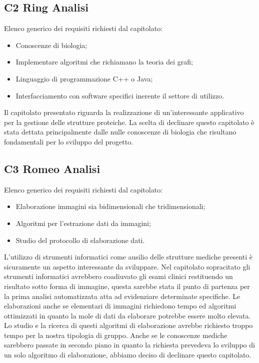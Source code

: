 \subsection{C2 Ring Analisi}
Elenco generico dei requisiti richiesti dal capitolato:
\begin{itemize} 
\item Conoscenze di biologia;
\item Implementare algoritmi che richiamano la teoria dei grafi;
\item Linguaggio di programmazione C++ o Java;
\item Interfacciamento con software specifici inerente il settore di utilizzo.
\end{itemize}
Il capitolato presentato riguarda la realizzazione di un'interessante applicativo per la gestione delle strutture proteiche. La scelta di declinare questo capitolato è stata dettata principalmente dalle nulle conoscenze di biologia che risultano fondamentali per lo sviluppo del progetto.\\
\subsection{C3 Romeo Analisi}
Elenco generico dei requisiti richiesti dal capitolato:
\begin{itemize} 
\item Elaborazione immagini sia bidimensionali che tridimensionali;
\item Algoritmi per l'estrazione dati da immagini;
\item Studio del protocollo di elaborazione dati.
\end{itemize}
L'utilizzo di strumenti informatici come ausilio delle strutture mediche presenti è sicuramente un aspetto interessante da sviluppare. Nel capitolato sopracitato gli strumenti informatici avrebbero coadiuvato gli esami clinici restituendo un risultato sotto forma di immagine, questa sarebbe stata il punto di partenza per la prima analisi automatizzata atta ad evidenziare determinate specifiche. Le elaborazioni anche se elementari di immagini richiedono tempo ed algoritmi ottimizzati in quanto la mole di dati da elaborare potrebbe essere molto elevata. Lo studio e la ricerca di questi algoritmi di elaborazione avrebbe richiesto troppo tempo per la nostra tipologia di gruppo. Anche se le conoscenze mediche sarebbero passate in secondo piano in quanto la richiesta prevedeva lo sviluppo di un solo algoritmo di elaborazione, abbiamo deciso di declinare questo capitolato.   \\
